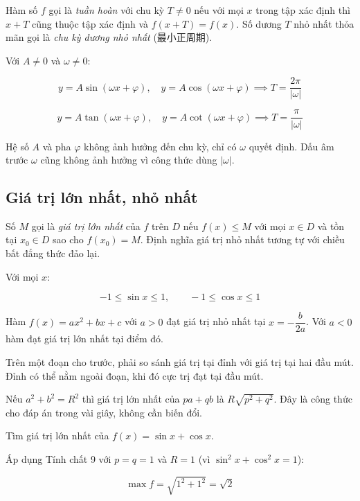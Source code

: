 \documentclass[11pt, a4paper]{article}
\begin{document}
\begin{dinhnghia}
Hàm số $f$ gọi là \emph{tuần hoàn} với chu kỳ $T \neq 0$ nếu với mọi $x$ trong tập xác định thì $x + T$ cũng thuộc tập xác định và $f(x + T) = f(x)$. Số dương $T$ nhỏ nhất thỏa mãn gọi là \emph{chu kỳ dương nhỏ nhất} (最小正周期).
\end{dinhnghia}
\begin{dinhly}
Với $A \neq 0$ và $\omega \neq 0$:

$$y = A\sin(\omega x + \varphi), \quad y = A\cos(\omega x + \varphi) \implies T = \frac{2\pi}{|\omega|}$$

$$y = A\tan(\omega x + \varphi), \quad y = A\cot(\omega x + \varphi) \implies T = \frac{\pi}{|\omega|}$$

 Hệ số $A$ và pha $\varphi$ không ảnh hưởng đến chu kỳ, chỉ có $\omega$ quyết định. Dấu âm trước $\omega$ cũng không ảnh hưởng vì công thức dùng $|\omega|$.

\end{dinhly}
\subsection{Giá trị lớn nhất, nhỏ nhất}

\begin{dinhnghia}
Số $M$ gọi là \emph{giá trị lớn nhất} của $f$ trên $D$ nếu $f(x) \le M$ với mọi $x \in D$ và tồn tại $x_0 \in D$ sao cho $f(x_0) = M$. Định nghĩa giá trị nhỏ nhất tương tự với chiều bất đẳng thức đảo lại.
\end{dinhnghia}
\begin{dinhly}
Với mọi $x$:

$$-1 \le \sin x \le 1, \qquad -1 \le \cos x \le 1$$
\end{dinhly}
\begin{dinhly}
Hàm $f(x) = ax^2 + bx + c$ với $a > 0$ đạt giá trị nhỏ nhất tại $x = -\dfrac{b}{2a}$. Với $a < 0$ hàm đạt giá trị lớn nhất tại điểm đó.

 Trên một đoạn cho trước, phải so sánh giá trị tại đỉnh với giá trị tại hai đầu mút. Đỉnh có thể nằm ngoài đoạn, khi đó cực trị đạt tại đầu mút.
\end{dinhly}
\begin{dinhly}
Nếu $a^2 + b^2 = R^2$ thì giá trị lớn nhất của $pa + qb$ là $R\sqrt{p^2 + q^2}$. Đây là công thức cho đáp án trong vài giây, không cần biến đổi.
\end{dinhly}
\begin{vidu}[{3}]
Tìm giá trị lớn nhất của $f(x) = \sin x + \cos x$.

Áp dụng Tính chất 9 với $p = q = 1$ và $R = 1$ (vì $\sin^2 x + \cos^2 x = 1$):

$$\max f = \sqrt{1^2 + 1^2} = \sqrt{2}$$

\end{vidu}
\end{document}

